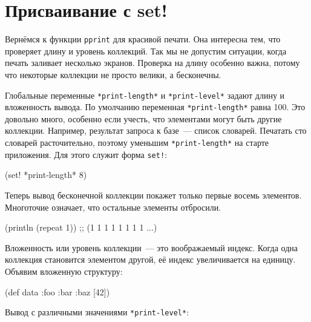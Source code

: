 \section{Присваивание с set!}


Вернёмся к функции \verb|pprint| для красивой печати. Она интересна тем, что
проверяет длину и уровень коллекций. Так мы не допустим ситуации, когда печать
заливает несколько экранов. Проверка на длину особенно важна, потому что
некоторые коллекции не просто велики, а бесконечны.


Глобальные переменные \verb|*print-length*| и \verb|*print-level*| задают длину
и вложенность вывода. По умолчанию переменная \verb|*print-length*| равна 100. Это довольно
много, особенно если учесть, что элементами могут быть другие
коллекции. Например, результат запроса к базе~--- список словарей. Печатать сто
словарей расточительно, поэтому уменьшим \verb|*print-length*| на старте
приложения. Для этого служит форма \verb|set!|:

\begin{english}
  \begin{clojure}
(set! *print-length* 8)
  \end{clojure}
\end{english}

Теперь вывод бесконечной коллекции покажет только первые восемь
элементов. Многоточие означает, что остальные элементы отбросили.

\begin{english}
  \begin{clojure}
(println (repeat 1))
;; (1 1 1 1 1 1 1 1 ...)
  \end{clojure}
\end{english}

Вложенность или уровень коллекции~--- это воображаемый индекс. Когда одна коллекция
становится элементом другой, её индекс увеличивается на единицу. Объявим
вложенную структуру:

\begin{english}
  \begin{clojure}
(def data {:foo
            {:bar
              {:baz [42]}}})
  \end{clojure}
\end{english}

\noindentnarrow
Вывод с различными значениями \texttt{*print\--le\-vel*}:

